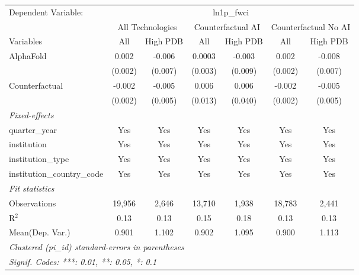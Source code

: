 \begingroup
\centering
\begin{tabular}{lcccccc}
   \tabularnewline \midrule \midrule
   Dependent Variable: & \multicolumn{6}{c}{ln1p\_fwci}\\
 & \multicolumn{2}{c}{All Technologies} & \multicolumn{2}{c}{Counterfactual AI} & \multicolumn{2}{c}{Counterfactual No AI} \\
\cmidrule(lr){1-1}\cmidrule(lr){2-3} \cmidrule(lr){4-5} \cmidrule(lr){6-7}
Variables & \multicolumn{1}{c}{All} & \multicolumn{1}{c}{High PDB} & \multicolumn{1}{c}{All} & \multicolumn{1}{c}{High PDB} & \multicolumn{1}{c}{All} & \multicolumn{1}{c}{High PDB} \\
\cmidrule(lr){1-1}\cmidrule(lr){2-2} \cmidrule(lr){3-3} \cmidrule(lr){4-4} \cmidrule(lr){5-5} \cmidrule(lr){6-6} \cmidrule(lr){7-7}
   AlphaFold                    & 0.002   & -0.006  & 0.0003  & -0.003  & 0.002   & -0.008\\   
                                & (0.002) & (0.007) & (0.003) & (0.009) & (0.002) & (0.007)\\   
   Counterfactual               & -0.002  & -0.005  & 0.006   & 0.006   & -0.002  & -0.005\\   
                                & (0.002) & (0.005) & (0.013) & (0.040) & (0.002) & (0.005)\\   
   \midrule
   \emph{Fixed-effects}\\
   quarter\_year                & Yes     & Yes     & Yes     & Yes     & Yes     & Yes\\  
   institution                  & Yes     & Yes     & Yes     & Yes     & Yes     & Yes\\  
   institution\_type            & Yes     & Yes     & Yes     & Yes     & Yes     & Yes\\  
   institution\_country\_code   & Yes     & Yes     & Yes     & Yes     & Yes     & Yes\\  
   \midrule
   \emph{Fit statistics}\\
   Observations                 & 19,956  & 2,646   & 13,710  & 1,938   & 18,783  & 2,441\\  
   R$^2$                        & 0.13    & 0.13    & 0.15    & 0.18    & 0.13    & 0.13\\  
Mean(Dep. Var.) & 0.901 & 1.102 & 0.902 & 1.095 & 0.900 & 1.113 \\
   \midrule \midrule
   \multicolumn{7}{l}{\emph{Clustered (pi\_id) standard-errors in parentheses}}\\
   \multicolumn{7}{l}{\emph{Signif. Codes: ***: 0.01, **: 0.05, *: 0.1}}\\
\end{tabular}
\par\endgroup
